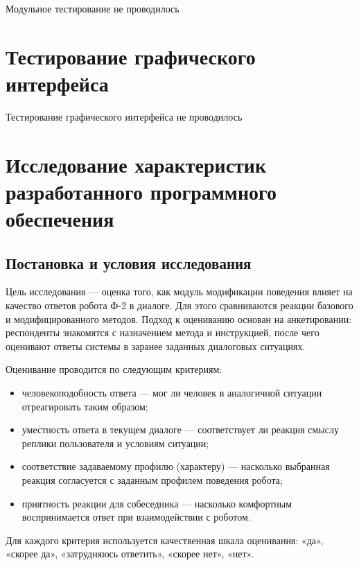 Модульное тестирование не проводилось

\chapter{Тестирование графического интерфейса}

Тестирование графического интерфейса не проводилось

\chapter{Исследование характеристик разработанного программного обеспечения}

\section{Постановка и условия исследования}

Цель исследования --- оценка того, как модуль модификации поведения влияет на качество ответов робота Ф-2 в диалоге.
Для этого сравниваются реакции базового и модифицированного методов.
Подход к оцениванию основан на анкетировании: респонденты знакомятся с назначением метода и инструкцией, после чего оценивают ответы системы в заранее заданных диалоговых ситуациях.

Оценивание проводится по следующим критериям:
\begin{itemize}
	\item человекоподобность ответа --- мог ли человек в аналогичной ситуации отреагировать таким образом;
	\item уместность ответа в текущем диалоге --- соответствует ли реакция смыслу реплики пользователя и условиям ситуации;
	\item соответствие задаваемому профилю (характеру) --- насколько выбранная реакция согласуется с заданным профилем поведения робота;
	\item приятность реакции для собеседника --- насколько комфортным воспринимается ответ при взаимодействии с роботом.
\end{itemize}

Для каждого критерия используется качественная шкала оценивания: «да», «скорее да», «затрудняюсь ответить», «скорее нет», «нет».

